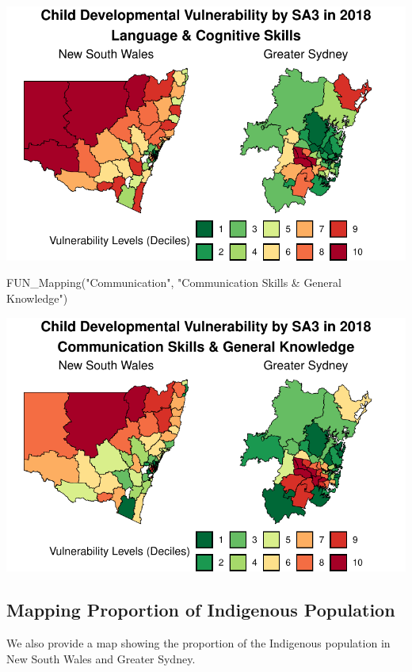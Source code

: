 \documentclass[
  letterpaper,
  DIV=11,
  numbers=noendperiod]{scrartcl}
\newenvironment{Shaded}{\begin{snugshade}}{\end{snugshade}}
\newcommand{\FunctionTok}[1]{\textcolor[rgb]{0.28,0.35,0.67}{#1}}
\newcommand{\NormalTok}[1]{\textcolor[rgb]{0.00,0.23,0.31}{#1}}
\newcommand{\StringTok}[1]{\textcolor[rgb]{0.13,0.47,0.30}{#1}}
\begin{document}
\includegraphics{variable_def_and_maps_files/figure-pdf/maps-AEDC-4.pdf}

\begin{Shaded}
\begin{Highlighting}[]
\FunctionTok{FUN\_Mapping}\NormalTok{(}\StringTok{"Communication"}\NormalTok{, }\StringTok{"Communication Skills \& General Knowledge"}\NormalTok{)}
\end{Highlighting}
\end{Shaded}

\includegraphics{variable_def_and_maps_files/figure-pdf/maps-AEDC-5.pdf}

\subsection{Mapping Proportion of Indigenous
Population}\label{mapping-proportion-of-indigenous-population}

We also provide a map showing the proportion of the Indigenous
population in New South Wales and Greater Sydney.
\end{document}
